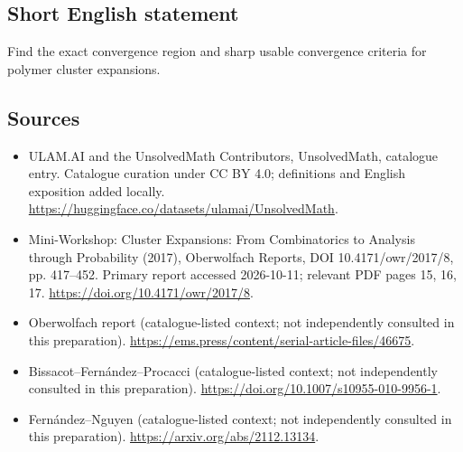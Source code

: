 \documentclass[11pt]{article}
\begin{document}
\subsection{Short English statement}
Find the exact convergence region and sharp usable convergence criteria for polymer cluster expansions.
\subsection{Sources}
\begin{itemize}
\item[\hypertarget{source:statement:1}{S1}] ULAM.AI and the UnsolvedMath Contributors, UnsolvedMath, catalogue entry. Catalogue curation under CC BY 4.0; definitions and English exposition added locally.
\url{https://huggingface.co/datasets/ulamai/UnsolvedMath}.
\item[\hypertarget{source:statement:2}{S2}] Mini-Workshop: Cluster Expansions: From Combinatorics to Analysis through Probability (2017), Oberwolfach Reports, DOI 10.4171/owr/2017/8, pp. 417--452. Primary report accessed 2026-10-11; relevant PDF pages 15, 16, 17.
\url{https://doi.org/10.4171/owr/2017/8}.
\item[\hypertarget{source:statement:3}{S3}] Oberwolfach report (catalogue-listed context; not independently consulted in this preparation).
\url{https://ems.press/content/serial-article-files/46675}.
\item[\hypertarget{source:statement:4}{S4}] Bissacot--Fernández--Procacci (catalogue-listed context; not independently consulted in this preparation).
\url{https://doi.org/10.1007/s10955-010-9956-1}.
\item[\hypertarget{source:statement:5}{S5}] Fernández--Nguyen (catalogue-listed context; not independently consulted in this preparation).
\url{https://arxiv.org/abs/2112.13134}.
\end{itemize}
\label{end:statement}
\end{document}
